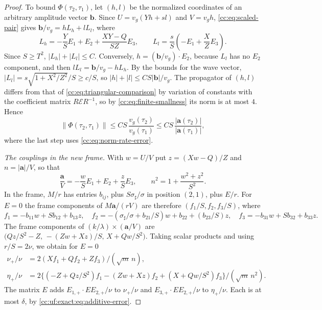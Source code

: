 \begin{proof}
To bound $\Phi(\tau_2,\tau_1)$, let $(h,l)$ be the normalized
coordinates of an arbitrary amplitude vector $\mathbf b$. Since $U=v_g(Yh+sl)$ and
$V=v_gh$, \eqref{cc:eq:scaled-pair} gives $\mathbf b/v_g=hL_h+lL_l$,
where
\[
 L_h=-\frac YSE_1+E_2+\frac{XY-Q}{SZ}E_3,\qquad
 L_l=\frac sS\left(-E_1+\frac XZE_3\right).
\]
Since $S\ge T^2$, $|L_h|+|L_l|\le C$.
Conversely, $h=(\mathbf b/v_g)\cdot E_2$, because $L_l$ has no $E_2$
component, and then $lL_l=\mathbf b/v_g-hL_h$. By the bounds for the
wave vector, $|L_l|=s\sqrt{1+X^2/Z^2}/S\ge c/S$, so
$|h|+|l|\le CS|\mathbf b|/v_g$. The propagator of $(h,l)$ differs from
that of \eqref{cc:eq:triangular-comparison} by variation of constants
with the coefficient matrix $R\mathcal ER^{-1}$, so by
\eqref{cc:eq:finite-smallness} its norm is at most $4$. Hence
\[
 \|\Phi(\tau_2,\tau_1)\|\le CS\,\frac{v_g(\tau_2)}{v_g(\tau_1)}
 \le CS\,\frac{|\mathbf a(\tau_2)|}{|\mathbf a(\tau_1)|},
\]
where the last step uses \eqref{cc:eq:norm-rate-error}.

\emph{The couplings in the new frame.} With $w=U/V$ put $z=(Xw-Q)/Z$ and
$n=|\mathbf a|/V$, so that
\[
 \frac{\mathbf a}V=-\frac wSE_1+E_2+\frac zSE_3,\qquad
 n^2=1+\frac{w^2+z^2}{S^2}.
\]
In the frame, $M/r$ has entries $b_{ij}$, plus $S\sigma_\sharp/\sigma$
in position $(2,1)$, plus $E/r$. For $E=0$ the frame components of
$M\mathbf a/(rV)$ are therefore $(f_1/S,f_2,f_3/S)$, where
\[
 f_1=-b_{11}w+Sb_{12}+b_{13}z,\quad
 f_2=-(\sigma_\sharp/\sigma+b_{21}/S)w+b_{22}+(b_{23}/S)z,\quad
 f_3=-b_{31}w+Sb_{32}+b_{33}z.
\]
The frame components of $(k/\lambda)\times(\mathbf a/V)$ are
$\bigl(Qz/S^2-Z,\,-(Zw+Xz)/S,\,X+Qw/S^2\bigr)$. Taking scalar products
and using $r/S=2\nu$, we obtain for $E=0$
\begin{align}\label{cc:eq:coupling-rational}
 \nu_+/\nu&=2(Xf_1+Qf_2+Zf_3)/(\sqrt m\,n),\\
 \eta_+/\nu&=2\{(-Z+Qz/S^2)f_1-(Zw+Xz)f_2
                         +(X+Qw/S^2)f_3\}/(\sqrt m\,n^2).
 \label{cc:eq:coupling-rational-end}
\end{align}
The matrix $E$ adds $E_{1,+}\cdot EE_{2,+}/\nu$ to $\nu_+/\nu$ and
$E_{3,+}\cdot EE_{2,+}/\nu$ to $\eta_+/\nu$. Each is at most $\delta$,
by \eqref{cc:uf:exact:eq:additive-error}.


\end{proof}
